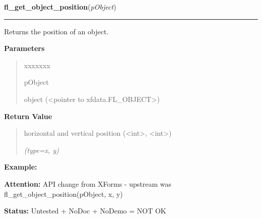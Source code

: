 \hspace{.8\funcindent}\begin{boxedminipage}{\funcwidth}

    \raggedright \textbf{fl\_get\_object\_position}(\textit{pObject})

    \vspace{-1.5ex}

    \rule{\textwidth}{0.5\fboxrule}
\setlength{\parskip}{2ex}
    Returns the position of an object.

\setlength{\parskip}{1ex}
      \textbf{Parameters}
      \vspace{-1ex}

      \begin{quote}
        \begin{Ventry}{xxxxxxx}

          \item[pObject]

          object ({\textless}pointer to xfdata.FL\_OBJECT{\textgreater})

        \end{Ventry}

      \end{quote}

      \textbf{Return Value}
    \vspace{-1ex}

      \begin{quote}
      horizontal and vertical position ({\textless}int{\textgreater}, 
      {\textless}int{\textgreater})

      {\it (type=x, y)}

      \end{quote}

\textbf{Example:} 

\textbf{Attention:} API change from XForms - upstream was fl\_get\_object\_position(pObject, x,
y)



\textbf{Status:} Untested + NoDoc + NoDemo = NOT OK



    \end{boxedminipage}

    \label{xformslib:library:fl_get_object_bbox}

    \vspace{0.5ex}

